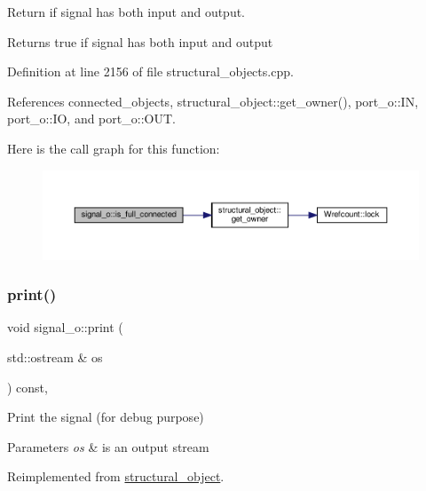 Return if signal has both input and output. 

\begin{DoxyReturn}{Returns}
true if signal has both input and output 
\end{DoxyReturn}


Definition at line 2156 of file structural\+\_\+objects.\+cpp.



References connected\+\_\+objects, structural\+\_\+object\+::get\+\_\+owner(), port\+\_\+o\+::\+IN, port\+\_\+o\+::\+IO, and port\+\_\+o\+::\+O\+UT.

Here is the call graph for this function\+:
\nopagebreak
\begin{figure}[H]
\begin{center}
\leavevmode
\includegraphics[width=350pt]{db/d5c/classsignal__o_af383bc62f79975c162fe66fe35a38b22_cgraph}
\end{center}
\end{figure}
\mbox{\label{classsignal__o_a97cec23d951b1b816b4a76a3a07a1490}} 
\subsubsection{\texorpdfstring{print()}{print()}}
{\footnotesize\ttfamily void signal\+\_\+o\+::print (\begin{DoxyParamCaption}\item[{std\+::ostream \&}]{os }\end{DoxyParamCaption}) const\hspace{0.3cm}{\ttfamily [override]}, {\ttfamily [virtual]}}



Print the signal (for debug purpose) 


\begin{DoxyParams}{Parameters}
{\em os} & is an output stream \\
\hline
\end{DoxyParams}


Reimplemented from \hyperlink{classstructural__object_a6770e169cf00f814a35b2939ec8f92eb}{structural\+\_\+object}.



